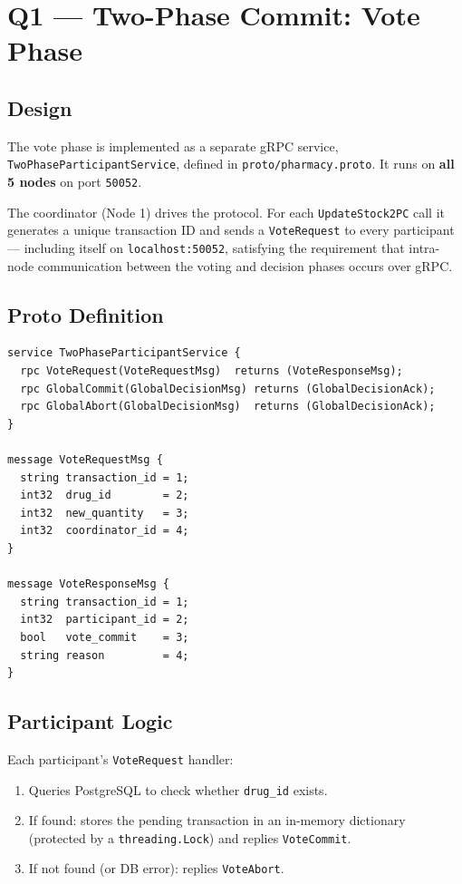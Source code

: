 \section{Q1 — Two-Phase Commit: Vote Phase}

\subsection*{Design}

The vote phase is implemented as a separate gRPC service,
\texttt{TwoPhaseParticipantService}, defined in \texttt{proto/pharmacy.proto}.
It runs on \textbf{all 5 nodes} on port \texttt{50052}.

The coordinator (Node 1) drives the protocol. For each \texttt{UpdateStock2PC}
call it generates a unique transaction ID and sends a \texttt{VoteRequest} to
every participant — including itself on \texttt{localhost:50052}, satisfying
the requirement that intra-node communication between the voting and decision
phases occurs over gRPC.

\newpage
\subsection*{Proto Definition}

\begin{lstlisting}[language={}]
service TwoPhaseParticipantService {
  rpc VoteRequest(VoteRequestMsg)  returns (VoteResponseMsg);
  rpc GlobalCommit(GlobalDecisionMsg) returns (GlobalDecisionAck);
  rpc GlobalAbort(GlobalDecisionMsg)  returns (GlobalDecisionAck);
}

message VoteRequestMsg {
  string transaction_id = 1;
  int32  drug_id        = 2;
  int32  new_quantity   = 3;
  int32  coordinator_id = 4;
}

message VoteResponseMsg {
  string transaction_id = 1;
  int32  participant_id = 2;
  bool   vote_commit    = 3;
  string reason         = 4;
}
\end{lstlisting}

\subsection*{Participant Logic}

Each participant's \texttt{VoteRequest} handler:
\begin{enumerate}
  \item Queries PostgreSQL to check whether \texttt{drug\_id} exists.
  \item If found: stores the pending transaction in an in-memory dictionary
        (protected by a \texttt{threading.Lock}) and replies \texttt{VoteCommit}.
  \item If not found (or DB error): replies \texttt{VoteAbort}.
\end{enumerate}

